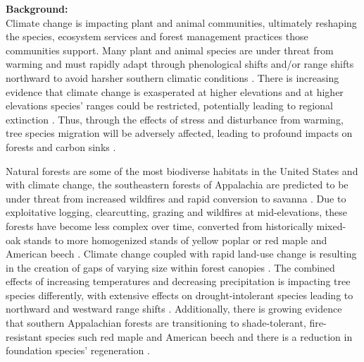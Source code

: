 \documentclass[11pt]{article}\usepackage[]{graphicx}\usepackage[]{color}
\begin{document}

\renewcommand{\thetable}{\arabic{table}}
\renewcommand{\thefigure}{\arabic{figure}}
\renewcommand{\labelitemi}{$-$}


{\noindent\Large{\textbf{Background:}}}\\
Climate change is impacting plant and animal communities, ultimately reshaping the species, ecosystem services and forest management practices those communities support. Many plant and animal species are under threat from warming and must rapidly adapt through phenological shifts and/or range shifts northward to avoid harsher southern climatic conditions \citep{Parmesan2003, Schwartz2006}. There is increasing evidence that climate change is exasperated at higher elevations \citep{Giorgi1997,Rangwala2012,Pepin2015} and at higher elevations species' ranges could be restricted, potentially leading to regional extinction \citep{Bachelet2001, Potter2008}. Thus, through the effects of stress and disturbance from warming, tree species migration will be adversely affected, leading to profound impacts on forests and carbon sinks \citep{Opdam2004}. %
  
Natural forests are some of the most biodiverse habitats in the United States \citep{White1988} and with climate change, the southeastern forests of Appalachia are predicted to be under threat from increased wildfires and rapid conversion to savanna \citep{Bachelet2001}. Due to exploitative logging, clearcutting, grazing and wildfires at mid-elevations, these forests have become less complex over time, converted from historically mixed-oak stands to more homogenized stands of yellow poplar or red maple and American beech \citep{Lorimer1989, Rentch2003, Rentch2003b, Runkle1982}. Climate change coupled with rapid land-use change is resulting in the creation of gaps of varying size within forest canopies \citep{Canham1999}. The combined effects of increasing temperatures and decreasing precipitation is impacting tree species differently, with extensive effects on drought-intolerant species leading to northward and westward range shifts \citep{Fei2017}. Additionally, there is growing evidence that southern Appalachian forests are transitioning to shade-tolerant, fire-resistant species such red maple and American beech \citep{Fei2017, Knott2019} and there is a reduction in foundation species' regeneration \citep{Izbicki2020}.
  
\end{document}

